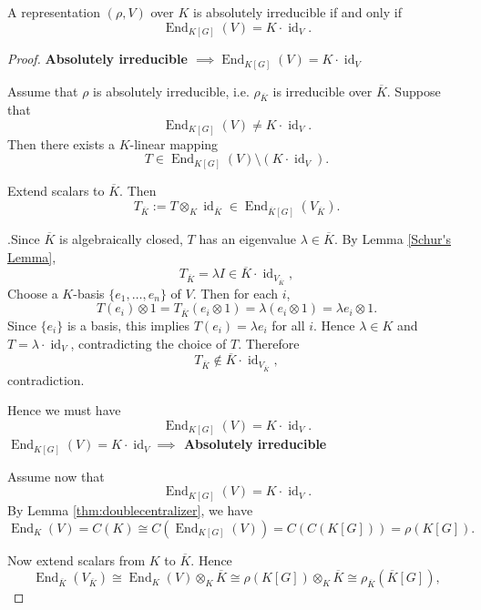\begin{lemma}\label{lem:absolutely_irreducible_criterion}
A representation \((\rho, V)\) over \(K\) is absolutely irreducible if and only if
\[
\operatorname{End}_{K[G]}(V) = K\cdot\operatorname{id}_V.
\]
\end{lemma}

\begin{proof}


\medskip
\noindent\textbf{Absolutely irreducible \(\implies \operatorname{End}_{K[G]}(V) = K\cdot \operatorname{id}_V\)}

Assume that \(\rho\) is absolutely irreducible, i.e. \(\rho_{\overline{K}}\) is irreducible over \(\overline{K}\).
Suppose that
\[
\operatorname{End}_{K[G]}(V) \neq K\cdot \operatorname{id}_V.
\]
Then there exists a \(K\)-linear mapping
\[
T \in \operatorname{End}_{K[G]}(V) \setminus 
(K\cdot \operatorname{id}_V).
\]

Extend scalars to \(\overline{K}\). Then
\[
T_{\overline{K}}:=T\otimes_
K \operatorname{id}_{\overline{K}}\in \operatorname{End}_{\overline{K}[G]}( V_{\overline{K}}).
\]

.Since \(\overline{K}\) is algebraically closed, \(T\) has an eigenvalue
\(\lambda \in \overline{K}\). By Lemma \ref{Schur's Lemma}, \[T_{\overline{K}}=\lambda I\in \overline{K}\cdot \operatorname{id}_{V_{\overline{K}}},\]
Choose a \(K\)-basis \(\{e_1,\dots,e_n\}\) of \(V\). Then for each \(i\),
\[
T(e_i) \otimes 1 = T_{\overline{K}}(e_i \otimes 1)
= \lambda (e_i \otimes 1)
= \lambda e_i \otimes 1.
\]
Since \(\{e_i\}\) is a basis, this implies \(T(e_i) = \lambda e_i\) for all \(i\). Hence \(\lambda \in K\) and \(T = \lambda \cdot \operatorname{id}_V\), contradicting the choice of \(T\). Therefore
\[
T_{\overline{K}} \notin \overline{K} \cdot \operatorname{id}_{V_{\overline{K}}},
\]contradiction.

Hence we must have
\[
\operatorname{End}_{K[G]}(V) = K\cdot \operatorname{id}_V.
\]
\medskip
\noindent
\textbf{ \(\operatorname{End}_{K[G]}(V) = K\cdot \operatorname{id}_V \implies\) Absolutely irreducible}

Assume now that
\[
\operatorname{End}_{K[G]}(V) = K\cdot \operatorname{id}_V.
\]
By Lemma \ref{thm:doublecentralizer}, we have \[\operatorname{End}_K(V)=C(K)\cong C(\operatorname{End}_{K[G]}(V))=C(C(K[G]))=\rho(K[G]).\]

Now extend scalars from \(K\) to \(\overline{K}\). Hence \[\operatorname{End}_{\overline{K}}(V_{\overline{K}})\cong \operatorname{End}_{K}(V) \otimes_K \overline{K}\cong\rho(K[G]) \otimes_K \overline{K}\cong\rho_{\overline{K}}(\overline{K}[G]),\]


\end{proof}
